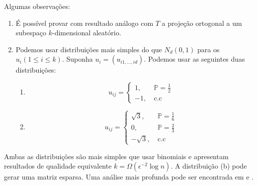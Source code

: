 Algumas observações:
\begin{enumerate}
    \item É possível provar com resultado análogo com $T$ a projeção ortogonal a um subespaço $k$-dimensional aleatório.
    \item Podemos usar distribuições mais simples do que $N_d(0,1)$ para os $u_i(1 \leq i \leq k)$. Suponha $u_i = (u_{i1,...,id})$. Podemos usar as seguintes duas distribuições:
    \begin{enumerate}
        \item 
        \[
                 u_{ij}=   \begin{cases} 
                        1,&\ \mathbb{P}=\frac{1}{2}\\ 
                        -1,&\ \text{c.c}\end{cases}
        \]
        \item
        \[
                 u_{ij}=   \begin{cases} 
                        \sqrt{3},&\ \mathbb{P}=\frac{1}{6}\\ 
                        0,&\ \mathbb{P}=\frac{2}{3} \\
                        -\sqrt{3},&\ \text{c.c}\end{cases}
        \]
    \end{enumerate}
\end{enumerate}

Ambas as distribuições são mais simples que usar binomiais e apresentam resultados de qualidade equivalente $k = \Omega(\epsilon^{-2}\log{n})$. A distribuição (b) pode gerar uma matriz esparsa. Uma análise mais profunda pode ser encontrada em \cite{achlioptas_2003}
e \cite{bingham_2001}.